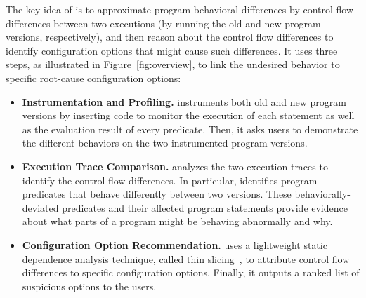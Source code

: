 
The key idea of \ourtool is to approximate program behavioral
differences by control flow differences between 
two executions (by running the old
and new program versions, respectively),
and then reason about the control flow differences to
identify configuration options that
might cause such differences. It uses
three steps, as illustrated in Figure~\ref{fig:overview},  to link the undesired
behavior to specific root-cause configuration options:

\vspace{-2mm}

\begin{itemize}

\vspace{-1mm}

\item \textbf{Instrumentation and Profiling.} \ourtool
instruments both old and new program versions by inserting
code to monitor the execution of each statement as well as the
evaluation result of every predicate. Then, it asks users to
demonstrate the different behaviors on the two instrumented
program versions. 

\item \textbf{Execution Trace Comparison.}
\ourtool analyzes the two execution traces to identify
the control flow differences. In particular, \ourtool
identifies program predicates that behave
differently between two versions. These
behaviorally-deviated predicates and their
affected program statements
provide evidence about what parts of a program might
be behaving abnormally and why.

\item \textbf{Configuration Option Recommendation.} 
\ourtool uses a lightweight static dependence analysis
technique, called thin slicing~\cite{Sridharan:2007}, to attribute
control flow differences to specific configuration options.
Finally, it outputs a ranked list of suspicious options to the users.


\end{itemize}

\vspace{-1mm}

